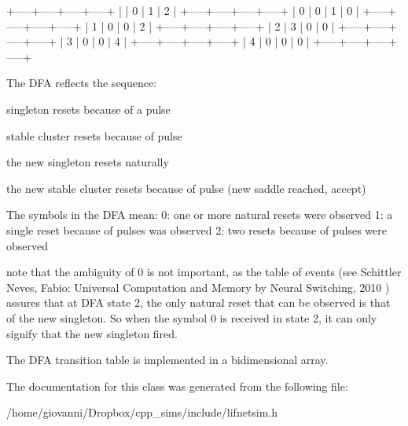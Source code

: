 \begin{DoxyVerb}+-----+-----+-----+-----+
|     |  0  |  1  |  2  |
+-----+-----+-----+-----+
|  0  |  0  |  1  |  0  |
+-----+-----+-----+-----+
|  1  |  0  |  0  |  2  |
+-----+-----+-----+-----+
|  2  |  3  |  0  |  0  |
+-----+-----+-----+-----+
|  3  |  0  |  0  |  4  |
+-----+-----+-----+-----+
|  4  |  0  |  0  |  0  |
+-----+-----+-----+-----+
\end{DoxyVerb}


The D\-F\-A reflects the sequence\-:
\begin{DoxyItemize}
\item singleton resets because of a pulse
\item stable cluster resets because of pulse
\item the new singleton resets naturally
\item the new stable cluster resets because of pulse (new saddle reached, accept)
\end{DoxyItemize}

The symbols in the D\-F\-A mean\-: 0\-: one or more natural resets were observed 1\-: a single reset because of pulses was observed 2\-: two resets because of pulses were observed

note that the ambiguity of 0 is not important, as the table of events (see Schittler Neves, Fabio\-: Universal Computation and Memory by Neural Switching, 2010 ) assures that at D\-F\-A state 2, the only natural reset that can be observed is that of the new singleton. So when the symbol 0 is received in state 2, it can only signify that the new singleton fired.

The D\-F\-A transition table is implemented in a bidimensional array. 

The documentation for this class was generated from the following file\-:\begin{DoxyCompactItemize}
\item 
/home/giovanni/\-Dropbox/cpp\-\_\-sims/include/lifnetsim.\-h\end{DoxyCompactItemize}
